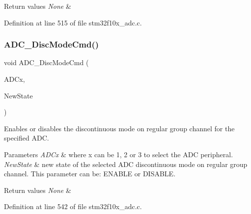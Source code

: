 \begin{DoxyRetVals}{Return values}
{\em None} & \\
\hline
\end{DoxyRetVals}


Definition at line 515 of file stm32f10x\+\_\+adc.\+c.

\mbox{\label{group___a_d_c___private___functions_ga1909649d10253ce88d986ffbb94a4be6}} 
\subsubsection{\texorpdfstring{A\+D\+C\+\_\+\+Disc\+Mode\+Cmd()}{ADC\_DiscModeCmd()}}
{\footnotesize\ttfamily void A\+D\+C\+\_\+\+Disc\+Mode\+Cmd (\begin{DoxyParamCaption}\item[{\hyperlink{struct_a_d_c___type_def}{A\+D\+C\+\_\+\+Type\+Def} $\ast$}]{A\+D\+Cx,  }\item[{\hyperlink{group___exported__types_gac9a7e9a35d2513ec15c3b537aaa4fba1}{Functional\+State}}]{New\+State }\end{DoxyParamCaption})}



Enables or disables the discontinuous mode on regular group channel for the specified A\+DC. 


\begin{DoxyParams}{Parameters}
{\em A\+D\+Cx} & where x can be 1, 2 or 3 to select the A\+DC peripheral. \\
\hline
{\em New\+State} & new state of the selected A\+DC discontinuous mode on regular group channel. This parameter can be\+: E\+N\+A\+B\+LE or D\+I\+S\+A\+B\+LE. \\
\hline
\end{DoxyParams}

\begin{DoxyRetVals}{Return values}
{\em None} & \\
\hline
\end{DoxyRetVals}


Definition at line 542 of file stm32f10x\+\_\+adc.\+c.

\mbox{\label{group___a_d_c___private___functions_gac5881d5995818001584b27b137a8dbcb}} 
